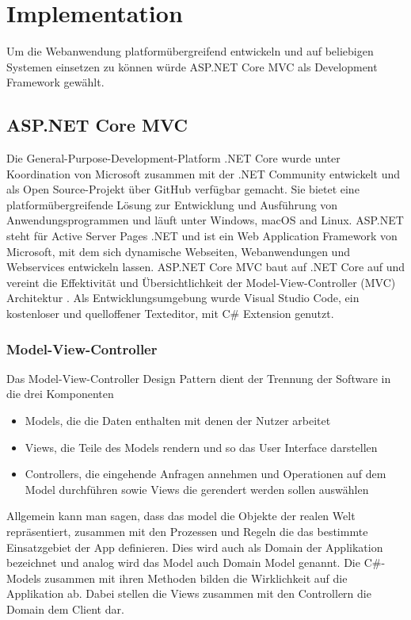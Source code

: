 \chapter{Implementation}\label{ch:implementation}

Um die Webanwendung platformübergreifend entwickeln und auf beliebigen Systemen einsetzen zu können würde ASP.NET Core MVC als Development Framework gewählt.

\section{ASP.NET Core MVC}

Die General-Purpose-Development-Platform .NET Core wurde unter Koordination von Microsoft zusammen mit der .NET Community entwickelt und als Open Source-Projekt über GitHub \cite{dotnetcore} verfügbar gemacht. Sie bietet eine platformübergreifende Lösung zur Entwicklung und Ausführung von Anwendungsprogrammen und läuft unter Windows, macOS and Linux. ASP.NET steht für Active Server Pages .NET und ist ein Web Application Framework von Microsoft, mit dem sich dynamische Webseiten, Webanwendungen und Webservices entwickeln lassen. ASP.NET Core MVC baut auf .NET Core auf und vereint die Effektivität und Übersichtlichkeit der Model-View-Controller (MVC) Architektur \cite{freeman2016pro}. Als Entwicklungsumgebung wurde Visual Studio Code, ein kostenloser und quelloffener Texteditor, mit C\# Extension genutzt.

\subsection{Model-View-Controller}

Das Model-View-Controller Design Pattern dient der Trennung der Software in die drei Komponenten

\begin{itemize}
	\item Models, die die Daten enthalten mit denen der Nutzer arbeitet
	\item Views, die Teile des Models rendern und so das User Interface darstellen 
	\item Controllers, die eingehende Anfragen annehmen und Operationen auf dem Model durchführen sowie Views die gerendert werden sollen auswählen
\end{itemize}

Allgemein kann man sagen, dass das model die Objekte der realen Welt repräsentiert, zusammen mit den Prozessen und Regeln die das  bestimmte Einsatzgebiet der App definieren. Dies wird auch als Domain der Applikation bezeichnet und analog wird das Model auch Domain Model genannt. Die C\#-Models zusammen mit ihren Methoden bilden die Wirklichkeit auf die Applikation ab. Dabei stellen die Views zusammen mit den Controllern die Domain dem Client dar.



